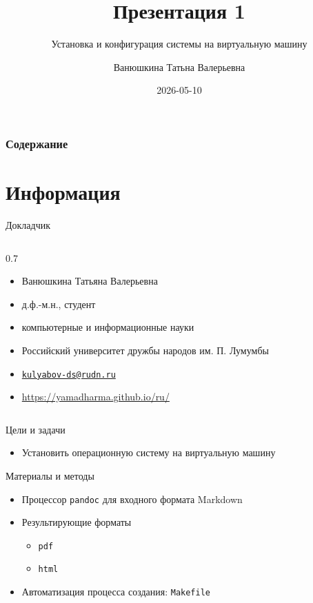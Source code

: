 \documentclass[
  ignorenonframetext,
  aspectratio=169,
]{beamer}
\title{Презентация 1}
\subtitle{Установка и конфигурация системы на виртуальную машину}
\author{Ванюшкина Татьна Валерьевна}
\date{2026-05-10}
\providecommand{\tightlist}{%
  \setlength{\itemsep}{0pt}\setlength{\parskip}{0pt}}\usepackage{longtable,booktabs,array}
\renewcommand*\contentsname{Содержание}
\newcommand\contentsname{Содержание}
\begin{document}
\frame{\titlepage}

\renewcommand*\contentsname{Содержание}
\begin{frame}[allowframebreaks]
  \frametitle{Содержание}
  \tableofcontents[hideallsubsections]
\end{frame}

\section{Информация}\label{ux438ux43dux444ux43eux440ux43cux430ux446ux438ux44f}

\begin{frame}{Докладчик}
\label{ux434ux43eux43aux43bux430ux434ux447ux438ux43a}
\begin{columns}[c]
\begin{column}{0.7\textwidth}
\begin{itemize}[<+->]
\tightlist
\item
  Ванюшкина Татьяна Валерьевна
\item
  д.ф.-м.н., студент
\item
  компьютерные и информационные науки
\item
  Российский университет дружбы народов им. П. Лумумбы
\item
  \href{mailto:kulyabov-ds@rudn.ru}{\nolinkurl{kulyabov-ds@rudn.ru}}
\item
  \url{https://yamadharma.github.io/ru/}
\end{itemize}
\end{column}
\end{columns}
\end{frame}

\begin{frame}{Цели и задачи}
\label{ux446ux435ux43bux438-ux438-ux437ux430ux434ux430ux447ux438}
\begin{itemize}[<+->]
\tightlist
\item
  Установить операционную систему на виртуальную машину
\end{itemize}
\end{frame}

\begin{frame}[fragile]{Материалы и методы}
\label{ux43cux430ux442ux435ux440ux438ux430ux43bux44b-ux438-ux43cux435ux442ux43eux434ux44b}
\begin{itemize}[<+->]
\tightlist
\item
  Процессор \texttt{pandoc} для входного формата Markdown
\item
  Результирующие форматы

  \begin{itemize}[<+->]
  \tightlist
  \item
    \texttt{pdf}
  \item
    \texttt{html}
  \end{itemize}
\item
  Автоматизация процесса создания: \texttt{Makefile}
\end{itemize}
\end{frame}
\end{document}
